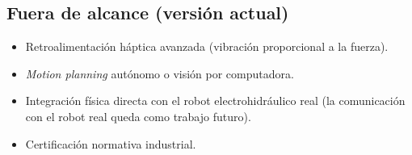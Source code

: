 \subsection{Fuera de alcance (versión actual)}

\begin{itemize}
    \item Retroalimentación háptica avanzada (vibración proporcional a la fuerza).
    \item \textit{Motion planning} autónomo o visión por computadora.
    \item Integración física directa con el robot electrohidráulico real (la comunicación con el robot real queda como trabajo futuro).
    \item Certificación normativa industrial.
\end{itemize}
